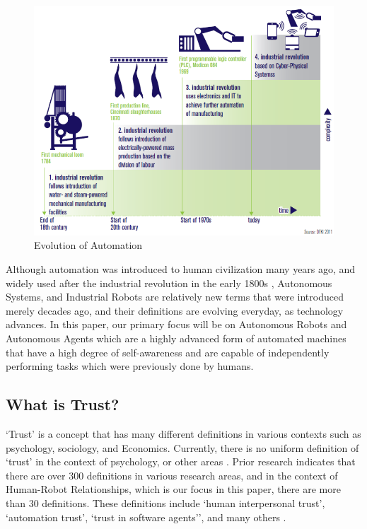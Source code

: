 \documentclass[runningheads,a4paper]{llncs}
\begin{document}
\begin{figure}
    \centering
        \includegraphics[width=\textwidth]{Figures/EvolutionOfAutomation.png}
    \caption{Evolution of Automation \cite{CyberSecurityInIndustry}}
    \label{Trust_Function}
\end{figure}
Although automation was introduced to human civilization many years ago, and widely used after the industrial revolution in the early 1800s \cite{IndustrialRevolution}, Autonomous Systems, and Industrial Robots are relatively new terms that were introduced merely decades ago, and their definitions are evolving everyday, as technology advances. In this paper, our primary focus will be on Autonomous Robots and Autonomous Agents which are a highly advanced form of automated machines that have a high degree of self-awareness and are capable of independently performing tasks which were previously done by humans.

\subsection{What is Trust?}
`Trust' is a concept that has many different definitions in various contexts such as psychology, sociology, and Economics. Currently, there is no uniform definition of `trust' in the context of psychology, or other areas \cite{adams2003trust}. Prior research indicates that there are over 300 definitions in various research areas, and in the context of Human-Robot Relationships, which is our focus in this paper, there are more than 30 definitions. These definitions include `human interpersonal trust', `automation trust', `trust in software agents'', and many others \cite{schaefer2013perception}. 
\end{document}
